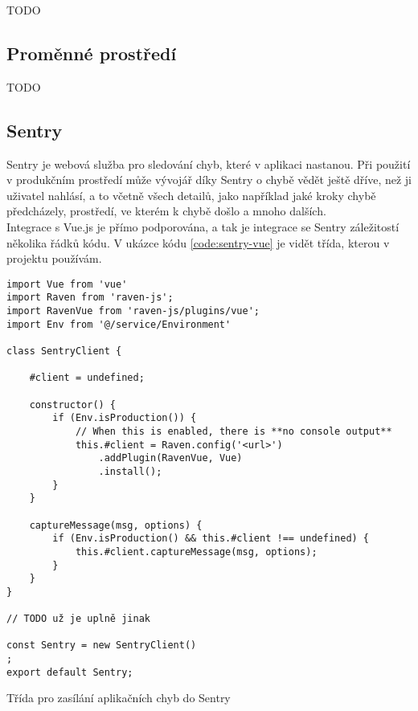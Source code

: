 TODO


\subsection{Proměnné prostředí}

TODO


\subsection{Sentry}

Sentry \cite{sentry} je webová služba pro sledování chyb, které v aplikaci nastanou. Při použití v produkčním prostředí může vývojář díky Sentry o chybě vědět ještě dříve, než ji uživatel nahlásí, a to včetně všech detailů, jako například jaké kroky chybě předcházely, prostředí, ve kterém k chybě došlo a mnoho dalších.\\
Integrace s Vue.js je přímo podporována, a tak je integrace se Sentry záležitostí několika řádků kódu. V ukázce kódu \ref{code:sentry-vue} je vidět třída, kterou v projektu používám.

\begin{listing}[H]
\begin{verbatim}
import Vue from 'vue'
import Raven from 'raven-js';
import RavenVue from 'raven-js/plugins/vue';
import Env from '@/service/Environment'

class SentryClient {

    #client = undefined;

    constructor() {
        if (Env.isProduction()) {
            // When this is enabled, there is **no console output**
            this.#client = Raven.config('<url>')
                .addPlugin(RavenVue, Vue)
                .install();
        }
    }

    captureMessage(msg, options) {
        if (Env.isProduction() && this.#client !== undefined) {
            this.#client.captureMessage(msg, options);
        }
    }
}

// TODO už je uplně jinak

const Sentry = new SentryClient()
;
export default Sentry;
\end{verbatim}
\caption{Třída pro zasílání aplikačních chyb do Sentry} \label{code:sentry-vue}
\end{listing}

